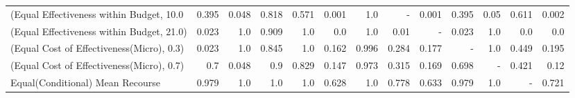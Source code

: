 \documentclass{article}
\begin{document}
\begin{table}[ht]
{\begin{tabular}{lrrrrrrrrrrrr}
(Equal Effectiveness within Budget, 10.0 &                                     0.395 &                                     0.048 &                            0.818 &                            0.571 &               0.001 &                                                1.0 &                                                  - &                                     0.001 &                                     0.395 &                                      0.05 &                            0.611 &                                      0.002 \\
(Equal Effectiveness within Budget, 21.0)          &                                     0.023 &                                       1.0 &                            0.909 &                              1.0 &                 0.0 &                                                1.0 &                                               0.01 &                                         - &                                     0.023 &                                       1.0 &                              0.0 &                                        0.0 \\
(Equal Cost of Effectiveness(Micro), 0.3)          &                                     0.023 &                                       1.0 &                            0.845 &                              1.0 &               0.162 &                                              0.996 &                                              0.284 &                                     0.177 &                                         - &                                       1.0 &                            0.449 &                                      0.195 \\
(Equal Cost of Effectiveness(Micro), 0.7)          &                                       0.7 &                                     0.048 &                              0.9 &                            0.829 &               0.147 &                                              0.973 &                                              0.315 &                                     0.169 &                                     0.698 &                                         - &                            0.421 &                                       0.12 \\
Equal(Conditional) Mean Recourse                   &                                     0.979 &                                       1.0 &                              1.0 &                              1.0 &               0.628 &                                                1.0 &                                              0.778 &                                     0.633 &                                     0.979 &                                       1.0 &                                - &                                      0.721 \\

\end{tabular}}
\end{table}
\end{document}
